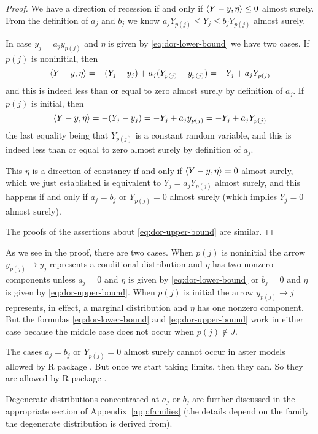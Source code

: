 \begin{proof}
We have a direction of recession if and only if $\langle Y - y, \eta \rangle \le 0$
almost surely.
From the definition
of $a_j$ and $b_j$ we know $a_j Y_{p(j)} \le Y_j \le b_j Y_{p(j)}$
almost surely.

In case $y_j = a_j y_{p(j)}$ and $\eta$ is
given by \eqref{eq:dor-lower-bound} we have two cases.
If $p(j)$ is noninitial, then
$$
   \langle Y - y, \eta \rangle = - (Y_j - y_j) + a_j (Y_{p(j)} - y_{p(j)})
   =
   - Y_j + a_j Y_{p(j)}
$$
and this is indeed less than or equal to zero almost surely by definition
of $a_j$.
If $p(j)$ is initial, then
$$
   \langle Y - y, \eta \rangle = - (Y_j - y_j)
   =
   - Y_j + a_j y_{p(j)}
   =
   - Y_j + a_j Y_{p(j)}
$$
the last equality being that $Y_{p(j)}$ is a constant random variable,
and this is indeed less than or equal to zero almost surely by definition
of $a_j$.

This $\eta$ is a direction of constancy if and only if
$\langle Y - y, \eta \rangle = 0$ almost surely, which we just established is
equivalent to $Y_j = a_j Y_{p(j)}$ almost surely, and this happens
if and only if $a_j = b_j$ or $Y_{p(j)} = 0$
almost surely (which implies $Y_j = 0$ almost surely).

The proofs of the assertions about \eqref{eq:dor-upper-bound} are
similar.
\end{proof}
As we see in the proof, there are two cases.  When $p(j)$ is noninitial
the arrow $y_{p(j)} \longrightarrow y_j$ represents a conditional
distribution and $\eta$ has two nonzero components unless $a_j = 0$ and
$\eta$ is given by \eqref{eq:dor-lower-bound} or $b_j = 0$ and
$\eta$ is given by \eqref{eq:dor-upper-bound}.
When $p(j)$ is initial the arrow $y_{p(j)} \longrightarrow j$ represents,
in effect, a marginal distribution and $\eta$ has one nonzero component.
But the formulas \eqref{eq:dor-lower-bound} and \eqref{eq:dor-upper-bound}
work in either case because the middle case does not occur when
$p(j) \notin J$.

The cases $a_j = b_j$ or $Y_{p(j)} = 0$ almost surely cannot occur in
aster models allowed by R package .  But once we start
taking limits, then they can.  So they are allowed by R package .

Degenerate distributions concentrated at $a_j$ or $b_j$ are further
discussed in the appropriate section of Appendix~\ref{app:families}
(the details depend on the family the degenerate distribution is derived
from).

